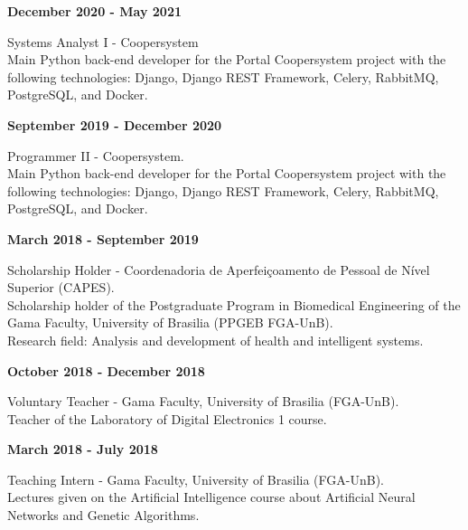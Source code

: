 \documentclass[11pt]{article}
\begin{document}
\newpage
\textbf{December 2020 - May 2021}
\begin{addmargin}{0.5cm}
    Systems Analyst I - Coopersystem \\
    Main Python back-end developer for the Portal Coopersystem project with the following technologies: Django, Django REST Framework, Celery, RabbitMQ, PostgreSQL, and Docker.\\
\end{addmargin}

\textbf{September 2019 - December 2020}
\begin{addmargin}{0.5cm}
Programmer II - Coopersystem.\\
Main Python back-end developer for the Portal Coopersystem project with the following technologies: Django, Django REST Framework, Celery, RabbitMQ, PostgreSQL, and Docker.\\
\end{addmargin}


\textbf{March 2018 - September 2019}
\begin{addmargin}{0.5cm}
Scholarship Holder - Coordenadoria de Aperfeiçoamento de Pessoal de Nível Superior (CAPES). \\
Scholarship holder of the Postgraduate Program in Biomedical Engineering of the
Gama Faculty, University of Brasilia (PPGEB FGA-UnB).\\
Research field: Analysis and development of health and intelligent systems.\\
\end{addmargin}

\textbf{October 2018 - December 2018}
\begin{addmargin}{0.5cm}
Voluntary Teacher -  Gama Faculty, University of Brasilia (FGA-UnB).\\
Teacher of the Laboratory of Digital Electronics 1 course. \\
\end{addmargin}

\textbf{March 2018 - July 2018}
\begin{addmargin}{0.5cm}
Teaching Intern - Gama Faculty, University of Brasilia (FGA-UnB).\\
Lectures given on the Artificial Intelligence  course  about Artificial Neural Networks
and Genetic Algorithms. \\
\end{addmargin}
\end{document}

